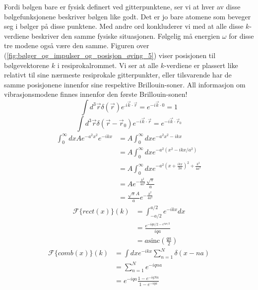 \documentclass{article}
\begin{document}
Fordi bølgen bare er fysisk definert ved gitterpunktene, ser vi at hver av disse bølgefunksjonene beskriver bølgen like godt. Det er jo bare atomene som beveger seg i bølger på disse punktene. Med andre ord konkluderer vi med at alle disse $k$-verdiene beskriver den samme fysiske situasjonen. Følgelig må energien $\omega$ for disse tre modene også være den samme.
Figuren over (\ref{fig:bølger_og_impulser_og_posisjon_øving_5}) viser posisjonen til bølgevektorene $k$ i resiprokalrommet. Vi ser at alle $k$-verdiene er plassert like relativt til sine nærmeste resiprokale gitterpunkter, eller tilsvarende har de samme posisjonene innenfor sine respektive Brillouin-soner. All informasjon om vibrasjonsmodene finnes innenfor den første Brillouin-sonen!
\nyside
{}
\begin{equation}
    \int d^3 \vec{r} \delta(\vec{r}) e^{.i \vec{k} \cdot \vec{r}} = e^{-i \vec{k} \cdot 0} = 1
\end{equation}
\begin{equation}
    \int d^3 \vec{r} \delta(\vec{r} - \vec{r}_0) e^{-i \vec{k} \cdot \vec{r}} = e^{- i \vec{k} \cdot \vec{r}_0}
\end{equation}
\begin{align}
    \int_0^\infty dx A e^{-a^2 x^2} e^{-ikx} &=  A \int_0^\infty dx e^{-a^2 x^2 -ikx} \\
   &=  A \int_0^\infty dx e^{-a^2 (x^2 -ikx / a^2)} \\
   &=  A \int_0^\infty dx e^{-a^2 (x + \frac{ikx}{2a})^2 + \frac{k^2}{4a^2}} \\
   &= Ae^{-\frac{k^2}{4a^2}} \frac{\sqrt{\pi}}{a}\\
   &= \frac{\sqrt{\pi} A}{a}e^{-\frac{k^2}{4a^2}} 
\end{align}
\begin{align}
    \mathcal{F}\{rect(x)\}(k) &= \int_{-a/2}^{a/2} e^{-ikx} dx \\
    &= \frac{e^{-iqa / 2 - e^{iqa/2}}}{iqa}\\
    &= a \text{sinc}\left(\frac{qa}{2}\right)
\end{align}
\begin{align}
      \mathcal{F}\{comb(x)\}(k) &= \int dx e^{-ikx} \sum^N_{n=1} \delta(x - na) \\
      &=\sum^N_{n=1} e^{-iqna}\\
      &=e^{-iqa} \frac{1- e^{-iqNa}}{1-e^{-iqa}}
\end{align}
\end{document}
